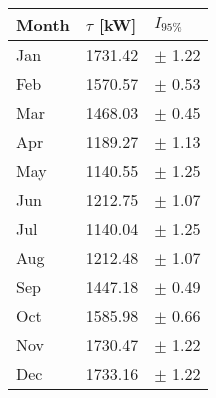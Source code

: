 \begin{tabular}{lll}
\toprule
Month & $\tau$ [kW] &  $I_{95\%}$ \\
\midrule
  Jan &     1731.42 &  $\pm$ 1.22 \\
  Feb &     1570.57 &  $\pm$ 0.53 \\
  Mar &     1468.03 &  $\pm$ 0.45 \\
  Apr &     1189.27 &  $\pm$ 1.13 \\
  May &     1140.55 &  $\pm$ 1.25 \\
  Jun &     1212.75 &  $\pm$ 1.07 \\
  Jul &     1140.04 &  $\pm$ 1.25 \\
  Aug &     1212.48 &  $\pm$ 1.07 \\
  Sep &     1447.18 &  $\pm$ 0.49 \\
  Oct &     1585.98 &  $\pm$ 0.66 \\
  Nov &     1730.47 &  $\pm$ 1.22 \\
  Dec &     1733.16 &  $\pm$ 1.22 \\
\bottomrule
\end{tabular}
